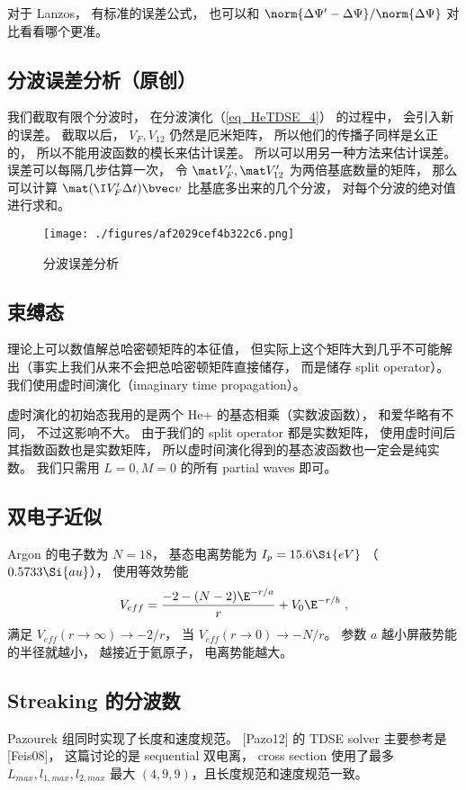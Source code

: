 对于 Lanzos， 有标准的误差公式， 也可以和 $\norm{\Delta \Psi' - \Delta \Psi}/\norm{\Delta \Psi}$ 对比看看哪个更准。

\subsection{分波误差分析（原创）}
我们截取有限个分波时， 在分波演化（\autoref{eq_HeTDSE_4}） 的过程中， 会引入新的误差。 截取以后， $V_F, V_{12}$ 仍然是厄米矩阵， 所以他们的传播子同样是幺正的， 所以不能用波函数的模长来估计误差。 所以可以用另一种方法来估计误差。 误差可以每隔几步估算一次， 令 $\mat V'_F, \mat V'_{12}$ 为两倍基底数量的矩阵， 那么可以计算 $\mat (\I V'_F\Delta t) \bvec v$ 比基底多出来的几个分波， 对每个分波的绝对值进行求和。
\begin{figure}[ht]
\centering
\texttt{[image: ./figures/af2029cef4b322c6.png]}
\caption{分波误差分析} \label{fig_HeTDSE_1}
\end{figure}

\subsection{束缚态}
理论上可以数值解总哈密顿矩阵的本征值， 但实际上这个矩阵大到几乎不可能解出（事实上我们从来不会把总哈密顿矩阵直接储存， 而是储存 split operator）。 我们使用虚时间演化（imaginary time propagation）。

虚时演化的初始态我用的是两个 He+ 的基态相乘（实数波函数）， 和爱华略有不同， 不过这影响不大。 由于我们的 split operator 都是实数矩阵， 使用虚时间后其指数函数也是实数矩阵， 所以虚时间演化得到的基态波函数也一定会是纯实数。
我们只需用 $L = 0, M = 0$ 的所有 partial waves 即可。

\subsection{双电子近似}
Argon 的电子数为 $N = 18$， 基态电离势能为 $I_p = 15.6\Si{eV}$ （$0.5733\Si{au}$）， 使用等效势能
\begin{equation}
V_{eff} = \frac{-2 - (N-2)\E^{-r/a}}{r} + V_0 \E^{-r/b}~,
\end{equation}
满足 $V_{eff}(r\to\infty) \to -2/r$， 当 $V_{eff}(r\to 0) \to -N/r$。 参数 $a$ 越小屏蔽势能的半径就越小， 越接近于氦原子， 电离势能越大。

\subsection{Streaking 的分波数}
Pazourek 组同时实现了长度和速度规范。 [Pazo12] 的 TDSE solver 主要参考是 [Feis08]， 这篇讨论的是 sequential 双电离， cross section 使用了最多 $L_{max},l_{1,max},l_{2,max}$ 最大 $(4,9,9)$，且长度规范和速度规范一致。

